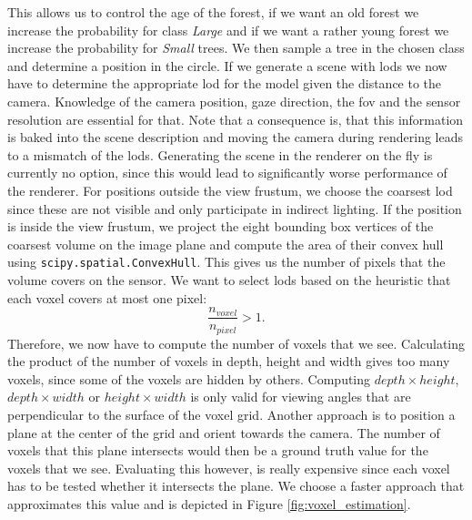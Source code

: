 This allows us to control the age of the forest, if we want an old forest we increase the probability for class \textit{Large} and if we want a rather young forest we increase the probability for \textit{Small} trees.
We then sample a tree in the chosen class and determine a position in the circle.
If we generate a scene with \acp{lod} we now have to determine the appropriate \ac{lod} for the model given the distance to the camera.
Knowledge of the camera position, gaze direction, the \ac{fov} and the sensor resolution are essential for that.
Note that a consequence is, that this information is baked into the scene description and moving the camera during rendering leads to a mismatch of the \acp{lod}.
Generating the scene in the renderer on the fly is currently no option, since this would lead to significantly worse performance of the renderer.
For positions outside the view frustum, we choose the coarsest \ac{lod} since these are not visible and only participate in indirect lighting.
If the position is inside the view frustum, we project the eight bounding box vertices of the coarsest volume on the image plane and compute the area of their convex hull using \texttt{scipy.spatial.ConvexHull}.
This gives us the number of pixels that the volume covers on the sensor.
We want to select \acp{lod} based on the heuristic that each voxel covers at most one pixel:
\begin{equation*}
    \frac{n_{voxel}}{n_{pixel}} > 1.
\end{equation*}
Therefore, we now have to compute the number of voxels that we see.
Calculating the product of the number of voxels in depth, height and width gives too many voxels, since some of the voxels are hidden by others.
Computing $depth \times height$, $depth \times width$ or $height \times width$ is only valid for viewing angles that are perpendicular to the surface of the voxel grid.
Another approach is to position a plane at the center of the grid and orient towards the camera.
The number of voxels that this plane intersects would then be a ground truth value for the voxels that we see.
Evaluating this however, is really expensive since each voxel has to be tested whether it intersects the plane.
We choose a faster approach that approximates this value and is depicted in Figure \ref{fig:voxel_estimation}.
